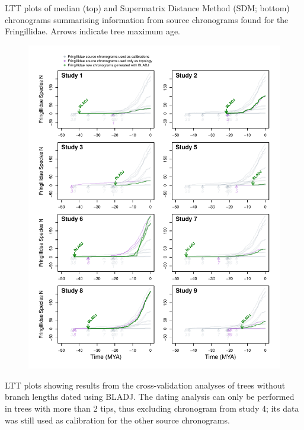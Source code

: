 \documentclass[]{article}
\begin{document}
LTT plots of median (top) and Supermatrix Distance Method (SDM; bottom) chronograms summarising information from source chronograms found for the Fringillidae. Arrows indicate tree maximum age.
\newpage
\begin{figure}[!h]
\includegraphics{./figures/fig_crossval_bladj.pdf}
\caption{}
\label{fig:cvbladj}
\end{figure}
LTT plots showing results from the cross-validation analyses of trees without branch lengths dated using BLADJ. The dating analysis can only be performed in trees with more than 2 tips, thus excluding chronogram from study 4; its data was still used as calibration for the other source chronograms.
\newpage
\end{document}
